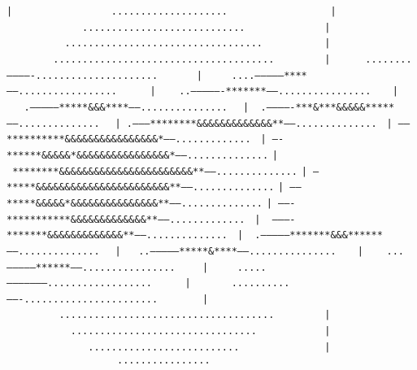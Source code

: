 {{\tt |~~~~~~~~~~~~~~~~~....................~~~~~~~~~~~~~~~~~}\newline
{\tt |~~~~~~~~~~~~~............................~~~~~~~~~~~~~}\newline
{\tt |~~~~~~~~~~..................................~~~~~~~~~~}\newline
{\tt |~~~~~~~~......................................~~~~~~~~}\newline
{\tt |~~~~~~........-------------.....................~~~~~~}\newline
{\tt |~~~~~....--------------****-----.................~~~~~}\newline
{\tt |~~~~..----------------*******------................~~~}\newline
{\tt |~~~.---------------*****\&\&\&****------...............~~}\newline
{\tt |~~.-------------***\&***\&\&\&\&\&*****-----..............~~}\newline
{\tt |~.---------********\&\&\&\&\&\&\&\&\&\&\&\&\&**-----..............~}\newline
{\tt |~------**********\&\&\&\&\&\&\&\&\&\&\&\&\&\&\&\&*------.............~}\newline
{\tt |~----******\&\&\&\&\&*\&\&\&\&\&\&\&\&\&\&\&\&\&\&\&\&*------..............}\newline
{\tt |~********\&\&\&\&\&\&\&\&\&\&\&\&\&\&\&\&\&\&\&\&\&\&\&**------..............}\newline
{\tt |~---*****\&\&\&\&\&\&\&\&\&\&\&\&\&\&\&\&\&\&\&\&\&\&\&**------..............}\newline
{\tt |~-----*****\&\&\&\&\&*\&\&\&\&\&\&\&\&\&\&\&\&\&\&\&**------..............}\newline
{\tt |~-------***********\&\&\&\&\&\&\&\&\&\&\&\&\&**------.............~}\newline
{\tt |~~----------*******\&\&\&\&\&\&\&\&\&\&\&\&\&**-----..............~}\newline
{\tt |~~.--------------*******\&\&\&******-----..............~~}\newline
{\tt |~~~..---------------*****\&****------...............~~~}\newline
{\tt |~~~~...---------------******------................~~~~}\newline
{\tt |~~~~~.....---------------------..................~~~~~}\newline
{\tt |~~~~~~~..........-------.......................~~~~~~~}\newline
{\tt |~~~~~~~~~.....................................~~~~~~~~}\newline
{\tt |~~~~~~~~~~~................................~~~~~~~~~~~}\newline
{\tt |~~~~~~~~~~~~~~..........................~~~~~~~~~~~~~~}\newline
{\tt |~~~~~~~~~~~~~~~~~~~................~~~~~~~~~~~~~~~~~~~}\\
}

